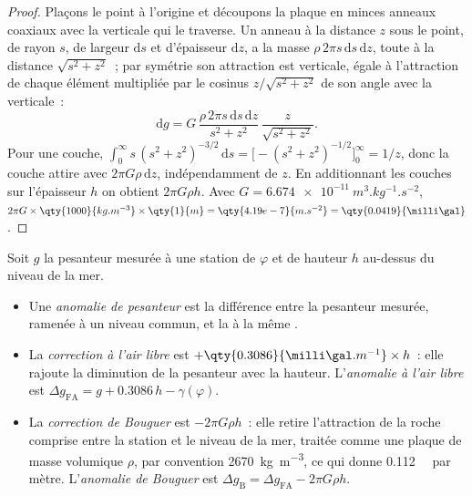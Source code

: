\begin{proof}
Plaçons le point à l'origine et découpons la plaque en minces anneaux coaxiaux avec
la verticale qui le traverse. Un anneau à la distance $z$ sous le point, de rayon
$s$, de largeur $\mathrm ds$ et d'épaisseur $\mathrm dz$, a la masse
$\rho\,2\pi s\,\mathrm ds\,\mathrm dz$, toute à la distance $\sqrt{s^2 + z^2}$~;
par symétrie son attraction est verticale, égale à l'attraction de chaque
élément multipliée par le cosinus $z/\sqrt{s^2+z^2}$ de son angle avec la verticale~:
\[
  \mathrm dg = G\,\frac{\rho\,2\pi s\,\mathrm ds\,\mathrm dz}{s^2 + z^2}\,
  \frac{z}{\sqrt{s^2 + z^2}} .
\]
Pour une couche, $\int_0^\infty s\,(s^2 + z^2)^{-3/2}\,\mathrm ds =
\bigl[-(s^2 + z^2)^{-1/2}\bigr]_0^\infty = 1/z$, donc la couche attire avec
$2\pi G\rho\,\mathrm dz$, indépendamment de $z$. En additionnant les couches sur
l'épaisseur $h$ on obtient $2\pi G\rho h$. Avec $G = \qty{6.674e-11}{m^3.kg^{-1}.s^{-2}}$,
$2\pi G\times\qty{1000}{kg.m^{-3}}\times\qty{1}{m} = \qty{4.19e-7}{m.s^{-2}} =
\qty{0.0419}{\milli\gal}$.
\end{proof}

\begin{definition}\label{def:b1:isostasy-gravity:anomalies}
Soit $g$ la pesanteur mesurée à une station de  $\varphi$ et de hauteur $h$
au-dessus du niveau de la mer.
\begin{itemize}
  \item Une \emph{anomalie de pesanteur} est la
        différence entre la pesanteur mesurée, ramenée à un niveau commun, et la
         à la même .
  \item La \emph{correction à l'air libre} est
        $+\qty{0.3086}{\milli\gal.m^{-1}}\times h$~: elle rajoute la diminution
        de la pesanteur avec la hauteur. L'\emph{anomalie à l'air
        libre} est
        $\Delta g_{\mathrm{FA}} = g + 0.3086\,h - \gamma(\varphi)$.
  \item La \emph{correction de Bouguer} est $-2\pi G\rho h$~:
        elle retire l'attraction de la roche comprise entre la station et le niveau
        de la mer, traitée comme une plaque de masse volumique $\rho$, par convention
        \qty{2670}{kg.m^{-3}}, ce qui donne \qty{0.112}{\milli\gal} par mètre.
        L'\emph{anomalie de Bouguer} est
        $\Delta g_{\mathrm B} = \Delta g_{\mathrm{FA}} - 2\pi G\rho h$.
\end{itemize}
\end{definition}

